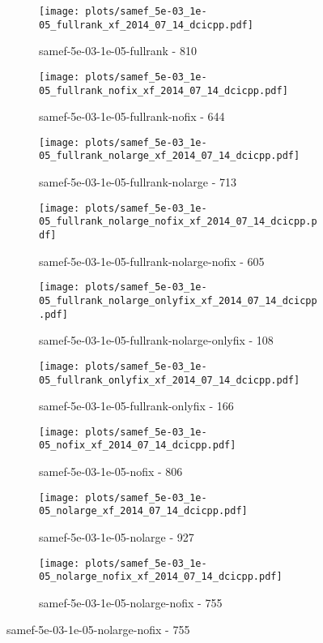 \begin{figure}[H]
  \centering
  \begin{subfigure}{0.48\textwidth}
    \texttt{[image: plots/samef\_5e-03\_1e-05\_fullrank\_xf\_2014\_07\_14\_dcicpp.pdf]}
    \caption{samef-5e-03-1e-05-fullrank - 810}
  \end{subfigure}
  \begin{subfigure}{0.48\textwidth}
    \texttt{[image: plots/samef\_5e-03\_1e-05\_fullrank\_nofix\_xf\_2014\_07\_14\_dcicpp.pdf]}
    \caption{samef-5e-03-1e-05-fullrank-nofix - 644}
  \end{subfigure}
  \begin{subfigure}{0.48\textwidth}
    \texttt{[image: plots/samef\_5e-03\_1e-05\_fullrank\_nolarge\_xf\_2014\_07\_14\_dcicpp.pdf]}
    \caption{samef-5e-03-1e-05-fullrank-nolarge - 713}
  \end{subfigure}
  \begin{subfigure}{0.48\textwidth}
    \texttt{[image: plots/samef\_5e-03\_1e-05\_fullrank\_nolarge\_nofix\_xf\_2014\_07\_14\_dcicpp.pdf]}
    \caption{samef-5e-03-1e-05-fullrank-nolarge-nofix - 605}
  \end{subfigure}
  \begin{subfigure}{0.48\textwidth}
    \texttt{[image: plots/samef\_5e-03\_1e-05\_fullrank\_nolarge\_onlyfix\_xf\_2014\_07\_14\_dcicpp.pdf]}
    \caption{samef-5e-03-1e-05-fullrank-nolarge-onlyfix - 108}
  \end{subfigure}
  \begin{subfigure}{0.48\textwidth}
    \texttt{[image: plots/samef\_5e-03\_1e-05\_fullrank\_onlyfix\_xf\_2014\_07\_14\_dcicpp.pdf]}
    \caption{samef-5e-03-1e-05-fullrank-onlyfix - 166}
  \end{subfigure}
  \begin{subfigure}{0.48\textwidth}
    \texttt{[image: plots/samef\_5e-03\_1e-05\_nofix\_xf\_2014\_07\_14\_dcicpp.pdf]}
    \caption{samef-5e-03-1e-05-nofix - 806}
  \end{subfigure}
  \begin{subfigure}{0.48\textwidth}
    \texttt{[image: plots/samef\_5e-03\_1e-05\_nolarge\_xf\_2014\_07\_14\_dcicpp.pdf]}
    \caption{samef-5e-03-1e-05-nolarge - 927}
  \end{subfigure}
  \begin{subfigure}{0.48\textwidth}
    \texttt{[image: plots/samef\_5e-03\_1e-05\_nolarge\_nofix\_xf\_2014\_07\_14\_dcicpp.pdf]}
    \caption{samef-5e-03-1e-05-nolarge-nofix - 755}

\end{subfigure}
\end{figure}
